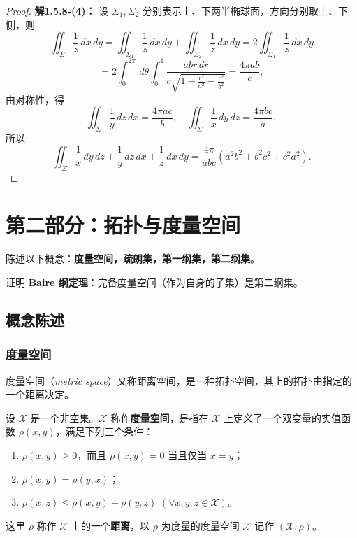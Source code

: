 \documentclass[12pt]{ctexart}
\begin{document}
\begin{proof}
\textbf{解1.5.8-(4)：}
设 $\Sigma_1, \Sigma_2$ 分别表示上、下两半椭球面，方向分别取上、下侧，则
\[
\iint_{\Sigma} \frac{1}{z} \, dx \, dy = \iint_{\Sigma_1} \frac{1}{z} \, dx \, dy + \iint_{\Sigma_2} \frac{1}{z} \, dx \, dy
= 2 \iint_{\Sigma_1} \frac{1}{z} \, dx \, dy 
\]
\[
= 2 \int_0^{2\pi} \, d\theta \int_0^1 \frac{abr \, dr}{c \sqrt{1 - \frac{r^2}{a^2} - \frac{r^2}{b^2}}}
= \frac{4\pi ab}{c},
\]
由对称性，得
\[
\iint_{\Sigma} \frac{1}{y} \, dz \, dx = \frac{4\pi ac}{b}, \quad
\iint_{\Sigma} \frac{1}{x} \, dy \, dz = \frac{4\pi bc}{a},
\]
所以
\[
\iint_{\Sigma} \frac{1}{x} \, dy \, dz + \frac{1}{y} \, dz \, dx + \frac{1}{z} \, dx \, dy
= \frac{4\pi}{abc} \left( a^2 b^2 + b^2 c^2 + c^2 a^2 \right).
\]

\end{proof}

\newpage
\section{第二部分：拓扑与度量空间}

陈述以下概念：\textbf{度量空间，疏朗集，第一纲集，第二纲集}。


证明 \textbf{Baire 纲定理}：完备度量空间（作为自身的子集）是第二纲集。
\setcounter{section}{2} %
\setcounter{subsection}{0} %
\subsection{概念陈述}
\setcounter{subsubsection}{0} %
\subsubsection{度量空间}
度量空间（\textit{metric space}）又称距离空间，是一种拓扑空间，其上的拓扑由指定的一个距离决定。

设 $\mathcal{X}$ 是一个非空集。$\mathcal{X}$ 称作\textbf{度量空间}，是指在 $\mathcal{X}$ 上定义了一个双变量的实值函数 $\rho(x, y)$，满足下列三个条件：
\begin{enumerate}
    \item $\rho(x, y) \geq 0$，而且 $\rho(x, y) = 0$ 当且仅当 $x = y$；
    \item $\rho(x, y) = \rho(y, x)$；
    \item $\rho(x, z) \leq \rho(x, y) + \rho(y, z)$ \quad $(\forall x, y, z \in \mathcal{X})$。
\end{enumerate}

这里 $\rho$ 称作 $\mathcal{X}$ 上的一个\textbf{距离}，以 $\rho$ 为度量的度量空间 $\mathcal{X}$ 记作 $(\mathcal{X}, \rho)$。
\end{document}
